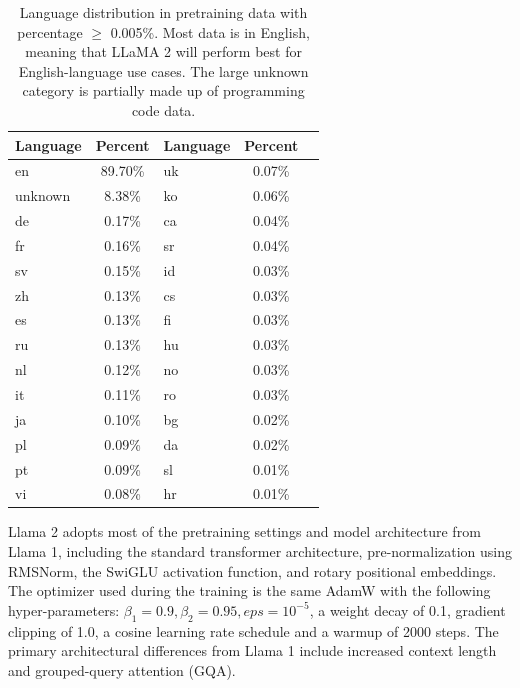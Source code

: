 \begin{table}[h!]
	\centering
	\begin{tabularx}{0.5\textwidth}{XclcX}
		\hline
		\textbf{Language} & \textbf{Percent} & \textbf{Language} & \textbf{Percent} \\
		\hline
		en                & 89.70\%          & uk                & 0.07\%           \\
		unknown           & 8.38\%           & ko                & 0.06\%           \\
		de                & 0.17\%           & ca                & 0.04\%           \\
		fr                & 0.16\%           & sr                & 0.04\%           \\
		sv                & 0.15\%           & id                & 0.03\%           \\
		zh                & 0.13\%           & cs                & 0.03\%           \\
		es                & 0.13\%           & fi                & 0.03\%           \\
		ru                & 0.13\%           & hu                & 0.03\%           \\
		nl                & 0.12\%           & no                & 0.03\%           \\
		it                & 0.11\%           & ro                & 0.03\%           \\
		ja                & 0.10\%           & bg                & 0.02\%           \\
		pl                & 0.09\%           & da                & 0.02\%           \\
		pt                & 0.09\%           & sl                & 0.01\%           \\
		vi                & 0.08\%           & hr                & 0.01\%           \\
		\hline
	\end{tabularx}
	\caption{Language distribution in pretraining data with percentage $\geq$ 0.005\%. Most data is in English, meaning that LLaMA 2 will perform best for English-language use cases. The large unknown category is partially made up of programming code data.}
	\label{tab:llama2-pretraining-data}
\end{table}

Llama 2 adopts most of the pretraining settings and model architecture from Llama 1, including the standard transformer architecture, pre-normalization using RMSNorm, the SwiGLU activation function, and rotary positional embeddings.
The optimizer used during the training is the same AdamW with the following hyper-parameters: $\beta_1=0.9, \beta_2=0.95, eps=10^{-5}$, a weight decay of 0.1, gradient clipping of 1.0, a cosine learning rate schedule and a warmup of 2000 steps.
The primary architectural differences from Llama 1 include increased context length and grouped-query attention (GQA).

